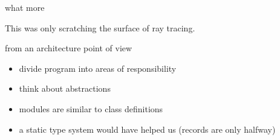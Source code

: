 \begin{frame}{what more}

This was only scratching the surface of ray tracing.

\end{frame}

\begin{frame}{from an architecture point of view}

\begin{itemize}
 \pause \item divide program into areas of responsibility
 \pause \item think about abstractions
 \pause \item modules are similar to class definitions
 \pause \item a static type system would have helped us (records are only halfway)
\end{itemize}

\end{frame}


